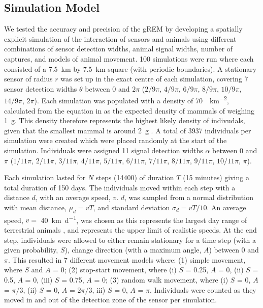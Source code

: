 \documentclass[a4paper,10pt,reqno,oneside]{amsart}
\begin{document}
\subsection*{Simulation Model}

We tested the accuracy and precision of the gREM by developing a spatially explicit simulation of the interaction of sensors and animals using different combinations of sensor detection widths, animal signal widths, number of captures, and models of animal movement. 100 simulations were run where each consisted of a  \SI{7.5}{\kilo\meter} by \SI{7.5}{\kilo\meter} square (with periodic boundaries). A stationary sensor of radius $r$ was set up in the exact centre of each simulation, covering 7 sensor detection widths $\theta$ between 0 and $2\pi$ ($2/9\pi$, $4/9\pi$, $6/9\pi$, $8/9\pi$, $10/9\pi$, $14/9\pi$, $2\pi$). Each simulation was populated with a density of \SI{70}{\animals\per\kilo\meter\squared}, calculated from the equation in \cite{damuth1981population} as the expected density of mammals of weighing \SI{1}{\gram}. This density therefore represents the highest likely density of indivudals, given that the smallest mammal is around \SI{2}{\gram} \citep{jones2009pantheria}. A total of 3937 individuals per simulation were created which were placed randomly at the start of the simulation. Individuals were assigned 11 signal detection widths $\alpha$ between 0 and $\pi$ ($1/11\pi$, $2/11\pi$, $3/11\pi$, $4/11\pi$, $5/11\pi$, $6/11\pi$, $7/11\pi$, $8/11\pi$, $9/11\pi$, $10/11\pi$, $\pi$).

Each simulation lasted for $N$ steps (14400) of duration $T$ (15 minutes) giving a total duration of 150 days. The individuals moved within each step with a distance $d$, with an average speed, $v$. $d$, was sampled from a normal distribution with mean distance, $\mu_d = vT$, and standard deviation $\sigma_d = vT/10$. An average speed, $v = $ \SI{40}{\kilo\meter \per \day}, was chosen as this represents the largest day range of terrestrial animals \citep{carbone2005far}, and represents the upper limit of realistic speeds. At the end step, individuals were allowed to either remain stationary for a time step (with a given probability, $S$), change direction (with a maximum angle, $A$) between 0 and $\pi$. This resulted in 7 different movement models where: (1) simple movement, where $S$ and $A$ = 0; (2) stop-start movement, where (i) $S$ = 0.25, $A$ = 0, (ii) $S$ = 0.5, $A$ = 0, (iii) $S$ = 0.75, $A$ = 0; (3) random walk movement, where (i) $S$ = 0, $A$ = $\pi/3$, (ii) $S$ = 0, $A$ = $2\pi/3$, iii) $S$ = 0, $A$ = $\pi$. Individuals were counted as they moved in and out of the detection zone of the sensor per simulation. 
\end{document}
